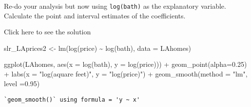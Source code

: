 \documentclass[
  letterpaper,
  DIV=11,
  numbers=noendperiod]{scrartcl}
\newenvironment{Shaded}{\begin{snugshade}}{\end{snugshade}}
\newcommand{\AttributeTok}[1]{\textcolor[rgb]{0.40,0.45,0.13}{#1}}
\newcommand{\FloatTok}[1]{\textcolor[rgb]{0.68,0.00,0.00}{#1}}
\newcommand{\FunctionTok}[1]{\textcolor[rgb]{0.28,0.35,0.67}{#1}}
\newcommand{\NormalTok}[1]{\textcolor[rgb]{0.00,0.23,0.31}{#1}}
\newcommand{\OtherTok}[1]{\textcolor[rgb]{0.00,0.23,0.31}{#1}}
\newcommand{\SpecialCharTok}[1]{\textcolor[rgb]{0.37,0.37,0.37}{#1}}
\newcommand{\StringTok}[1]{\textcolor[rgb]{0.13,0.47,0.30}{#1}}
\begin{document}
\begin{tcolorbox}[enhanced jigsaw, titlerule=0mm, colbacktitle=quarto-callout-warning-color!10!white, opacityback=0, left=2mm, rightrule=.15mm, toptitle=1mm, opacitybacktitle=0.6, colback=white, coltitle=black, breakable, bottomrule=.15mm, arc=.35mm, bottomtitle=1mm, title={Task 3}, toprule=.15mm, leftrule=.75mm, colframe=quarto-callout-warning-color-frame]

Re-do your analysis but now using \texttt{log(bath)} as the explanatory
variable. Calculate the point and interval estimates of the
coefficients.

Click here to see the solution

\begin{Shaded}
\begin{Highlighting}[]
\NormalTok{slr\_LAprices2 }\OtherTok{\textless{}{-}} \FunctionTok{lm}\NormalTok{(}\FunctionTok{log}\NormalTok{(price) }\SpecialCharTok{\textasciitilde{}} \FunctionTok{log}\NormalTok{(bath), }\AttributeTok{data =}\NormalTok{ LAhomes)}

\FunctionTok{ggplot}\NormalTok{(LAhomes, }\FunctionTok{aes}\NormalTok{(}\AttributeTok{x =}  \FunctionTok{log}\NormalTok{(bath), }\AttributeTok{y =} \FunctionTok{log}\NormalTok{(price))) }\SpecialCharTok{+}
  \FunctionTok{geom\_point}\NormalTok{(}\AttributeTok{alpha=}\FloatTok{0.25}\NormalTok{) }\SpecialCharTok{+}
  \FunctionTok{labs}\NormalTok{(}\AttributeTok{x =} \StringTok{"log(aquare feet)"}\NormalTok{, }\AttributeTok{y =} \StringTok{"log(price)"}\NormalTok{) }\SpecialCharTok{+}
  \FunctionTok{geom\_smooth}\NormalTok{(}\AttributeTok{method =} \StringTok{"lm"}\NormalTok{, }\AttributeTok{level =}\FloatTok{0.95}\NormalTok{)}
\end{Highlighting}
\end{Shaded}

\begin{verbatim}
`geom_smooth()` using formula = 'y ~ x'
\end{verbatim}


\end{tcolorbox}
\end{document}
